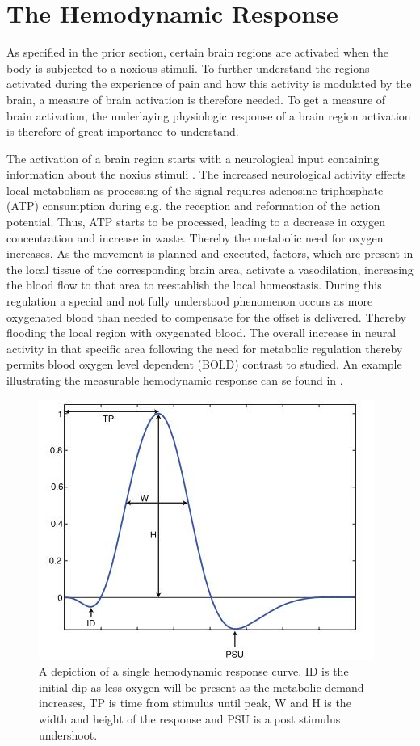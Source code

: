 
\section{The Hemodynamic Response}

As specified in the prior section, certain brain regions are activated when the body is subjected to a noxious stimuli. To further understand the regions activated during the experience of pain and how this activity is modulated by the brain, a measure of brain activation is therefore needed. To get a measure of brain activation, the underlaying physiologic response of a brain region activation is therefore of great importance to understand. 

The activation of a brain region starts with a neurological input containing information about the noxius stimuli \cite{Tracey2007}. The increased neurological activity effects local metabolism as processing of the signal requires adenosine triphosphate (ATP) consumption during e.g. the reception and reformation of the action potential. Thus, ATP starts to be processed, leading to a decrease in oxygen concentration and increase in waste. Thereby the metabolic need for oxygen increases. As the movement is planned and executed, factors, which are present in the local tissue of the corresponding brain area, activate a vasodilation, increasing the blood flow to that area to reestablish the local homeostasis. During this regulation a special and not fully understood phenomenon occurs as more oxygenated blood than needed to compensate for the offset is delivered. Thereby flooding the local region with oxygenated blood. The overall increase in neural activity in that specific area following the need for metabolic regulation thereby permits blood oxygen level dependent (BOLD) contrast to studied. An example illustrating the measurable hemodynamic response can se found in . \cite{Glover2011,Poldrack2011}

\begin{figure}[H]                 
	\includegraphics[width=.48\textwidth]{figures/aBackground/HRF}  
	\caption{A depiction of a single hemodynamic response curve. ID is the initial dip as less oxygen will be present as the metabolic demand increases, TP is time from stimulus until peak, W and H is the width and height of the response and PSU is a post stimulus undershoot. \cite{Poldrack2011}}
	\label{fig:back:HRF} 
\end{figure}

